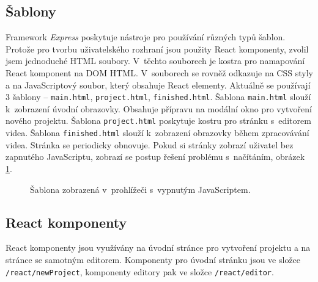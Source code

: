 \subsection{Šablony}
Framework \textit{Express} poskytuje nástroje pro používání různých typů šablon. Protože pro tvorbu uživatelského rozhraní jsou použity React komponenty, zvolil jsem jednoduché HTML soubory. V~těchto souborech je kostra pro namapování React komponent na DOM HTML. V~souborech se rovněž odkazuje na CSS styly a na JavaScriptový soubor, který obsahuje React elementy. Aktuálně se používají 3 šablony -- \texttt{main.html}, \texttt{project.html}, \texttt{finished.html}. Šablona \texttt{main.html} slouží k~zobrazení úvodní obrazovky. Obsahuje přípravu na modální okno pro vytvoření nového projektu. Šablona \texttt{project.html} poskytuje kostru pro stránku s~editorem videa. Šablona \texttt{finished.html} slouží k~zobrazení obrazovky během zpracovávání videa. Stránka se periodicky obnovuje. Pokud si stránky zobrazí uživatel bez zapnutého JavaScriptu, zobrazí se postup řešení problému s~načítáním, obrázek \ref{img:loading-page}.
\begin{figure}[h]
	\centering
	\caption{Šablona zobrazená v~prohlížeči s~vypnutým JavaScriptem.}\label{img:loading-page}
\end{figure}

\subsection{React komponenty}
React komponenty jsou využívány na úvodní stránce pro vytvoření projektu a na stránce se samotným editorem. Komponenty pro úvodní stránku jsou ve složce \texttt{/react/newProject}, komponenty editory pak ve složce \texttt{/react/editor}.

